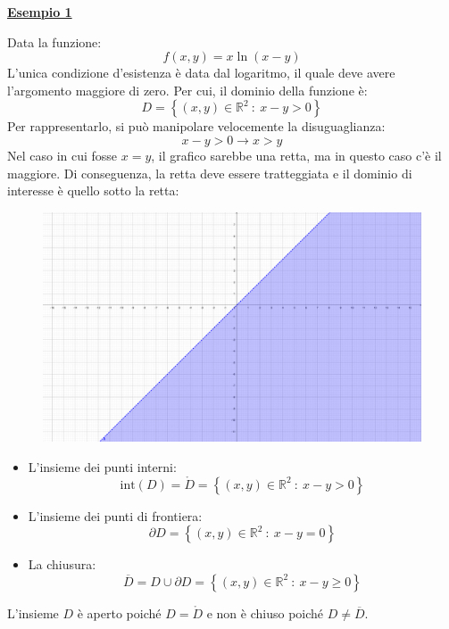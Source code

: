 \documentclass[a4paper]{article}
\newcommand{\example}[1]{\textcolor{Green4}{\textbf{#1}}}
\begin{document}
	\begin{flushleft}
		\example{\underline{Esempio 1}}
	\end{flushleft}

	\noindent
	Data la funzione:
	\begin{equation*}
		f\left(x,y\right) = x\ln\left(x-y\right)
	\end{equation*}
	L'unica condizione d'esistenza è data dal logaritmo, il quale deve avere l'argomento maggiore di zero. Per cui, il dominio della funzione è:
	\begin{equation*}
		D = \left\{\left(x,y\right) \in \mathbb{R}^{2} \: : \: x-y > 0\right\}
	\end{equation*}
	Per rappresentarlo, si può manipolare velocemente la disuguaglianza:
	\begin{equation*}
		x-y>0 \rightarrow x > y
	\end{equation*}
	Nel caso in cui fosse $x = y$, il grafico sarebbe una retta, ma in questo caso c'è il maggiore. Di conseguenza, la retta deve essere tratteggiata e il dominio di interesse è quello sotto la retta:
	\begin{figure}[!htp]
		\centering
		\includegraphics[width=.7\textwidth]{img/dominio_di_funzioni-1.pdf}
	\end{figure}
	\begin{itemize}
		\item L'insieme dei punti interni:
		\begin{equation*}
			\mathrm{int}\left(D\right) = \mathring{D} = \left\{\left(x,y\right) \in \mathbb{R}^{2} \: : \: x-y > 0\right\}
		\end{equation*}

		\item L'insieme dei punti di frontiera:
		\begin{equation*}
			\partial D = \left\{\left(x,y\right) \in \mathbb{R}^{2} \: : \: x - y = 0\right\}
		\end{equation*}

		\item La chiusura:
		\begin{equation*}
			\overline{D} = D \cup \partial D = \left\{\left(x,y\right) \in \mathbb{R}^{2} \: : \: x - y \ge 0\right\}
		\end{equation*}
	\end{itemize}
	L'insieme $D$ è aperto poiché $D = \mathring{D}$ e non è chiuso poiché $D \ne \overline{D}$.\newpage
\end{document}
